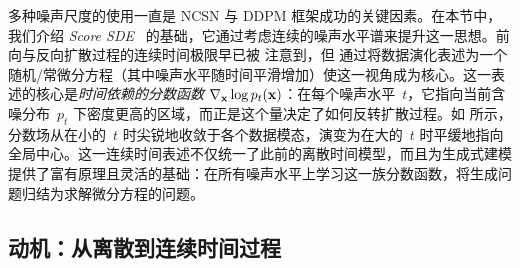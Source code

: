 
多种噪声尺度的使用一直是 NCSN 与 DDPM 框架成功的关键因素。在本节中，我们介绍 \emph{Score SDE}~\citep{song2020score} 的基础，它通过考虑连续的噪声水平谱来提升这一思想。前向与反向扩散过程的连续时间极限早已被 \citet{sohl2015deep} 注意到，但 \citet{song2020score} 通过将数据演化表述为一个随机/常微分方程（其中噪声水平随时间平滑增加）使这一视角成为核心。这一表述的核心是\emph{时间依赖的分数函数} $\nabla_{{\mathbf{x}}}\log p_t({\mathbf{x}})$：在每个噪声水平~$t$，它指向当前含噪分布~$p_t$ 下密度更高的区域，而正是这个量决定了如何反转扩散过程。如  所示，分数场从在小的~$t$ 时尖锐地收敛于各个数据模态，演变为在大的~$t$ 时平缓地指向全局中心。这一连续时间表述不仅统一了此前的离散时间模型，而且为生成式建模提供了富有原理且灵活的基础：在所有噪声水平上学习这一族分数函数，将生成问题归结为求解微分方程的问题。






\subsection{动机：从离散到连续时间过程}\label{subsec:scoresde-motivation}

